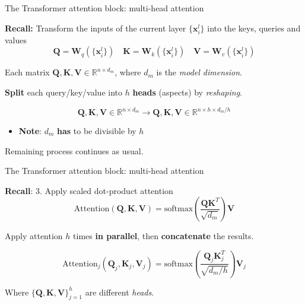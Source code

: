 \documentclass[12pt,aspectratio=169,handout]{beamer}
\begin{document}
\begin{frame}{The Transformer attention block: multi-head attention}

	\textbf{Recall:} Transform the inputs of the current layer $\{\bm{x}^l_i\}$ into the keys, queries and values
	$$
	\bm{Q} = \bm{W}_q (\{\bm{x}^l_i\}) \quad \bm{K} = \bm{W}_k (\{\bm{x}^l_i\}) \quad \bm{V} = \bm{W}_v (\{\bm{x}^l_i\})
	$$

	\pause
	Each matrix $\bm{Q}, \bm{K}, \bm{V} \in \mathbb{R}^{n \times d_m}$, where $d_m$ is the \textit{model dimension}.

	\pause
	\textbf{Split} each query/key/value into $h$ \textbf{heads} (aspects) by \textit{reshaping}. 

	$$
		\bm{Q}, \bm{K}, \bm{V} \in \mathbb{R}^{n \times d_m} \to \bm{Q}, \bm{K}, \bm{V} \in \mathbb{R}^{n \times h \times d_m/h}
	$$
	\pause
	\begin{itemize}
		\item \textbf{Note}: $d_m$ \textbf{has} to be divisible by $h$
	\end{itemize}
	\pause 
	Remaining process continues as usual.

\end{frame}

\begin{frame}{The Transformer attention block: multi-head attention}

\textbf{Recall}: 3. Apply scaled dot-product attention
$$
	\text{Attention} (\bm{Q},\bm{K},\bm{V}) = \text{softmax} \left( \frac{\bm{Q}\bm{K}^T}{\sqrt{d_m}}\right) \bm{V} 
$$

\pause

Apply attention $h$ times \textbf{in parallel}, then \textbf{concatenate} the results.

\pause


$$
	\text{Attention}_j (\bm{Q}_j, \bm{K}_j, \bm{V}_j) = \text{softmax} \left( \frac{\bm{Q}_j \bm{K}_j^T}{ \sqrt{d_m / h} } \right) \bm{V}_j 
$$

\pause

Where $ \{ \bm{Q}, \bm{K}, \bm{V} \}^h_{j=1} $ are different \textit{heads}.

\end{frame}
\end{document}
